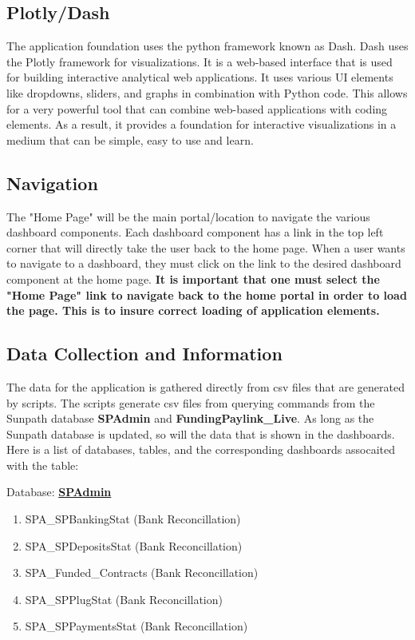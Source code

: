\documentclass[titlepage]{article}
\begin{document}
\subsection{Plotly/Dash}
The application foundation uses the python framework known as Dash. Dash uses the Plotly framework for visualizations. It is a web-based interface that is used for building interactive analytical web applications. It uses various UI elements like dropdowns, sliders, and graphs in combination with Python code. This allows for a very powerful tool that can combine web-based applications with coding elements. As a result, it provides a foundation for interactive visualizations in a medium that can be simple, easy to use and learn.  

\subsection{Navigation}
The "Home Page" will be the main portal/location to navigate the various dashboard components. Each dashboard component has a link in the top left corner that will directly take the user back to the home page. When a user wants to navigate to a dashboard, they must click on the link to the desired dashboard component at the home page. \textbf{It is important that one must select the "Home Page" link to navigate back to the home portal in order to load the page. This is to insure correct loading of application elements.}

\subsection{Data Collection and Information}
The data for the application is gathered directly from csv files that are generated by scripts. The scripts generate csv files from querying commands from the Sunpath database \textbf{SPAdmin} and \textbf{FundingPaylink\_Live}. As long as the Sunpath database is updated, so will the data that is shown in the dashboards. Here is a list of databases, tables, and the corresponding dashboards assocaited with the table:

Database: \underline{\textbf{SPAdmin}}
\begin{enumerate}
	\item SPA\_SPBankingStat (Bank Reconcillation)
	\item SPA\_SPDepositsStat (Bank Reconcillation)
	\item SPA\_Funded\_Contracts (Bank Reconcillation)
	\item SPA\_SPPlugStat (Bank Reconcillation)
	\item SPA\_SPPaymentsStat (Bank Reconcillation)
\end{enumerate}
\end{document}
